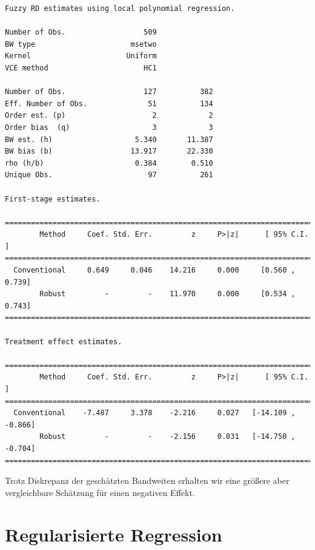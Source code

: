 \documentclass[
  a4paper,
  DIV=11,
  oneside]{scrreprt}
\begin{document}
\begin{verbatim}
Fuzzy RD estimates using local polynomial regression.

Number of Obs.                  509
BW type                      msetwo
Kernel                      Uniform
VCE method                      HC1

Number of Obs.                  127          382
Eff. Number of Obs.              51          134
Order est. (p)                    2            2
Order bias  (q)                   3            3
BW est. (h)                   5.340       11.387
BW bias (b)                  13.917       22.330
rho (h/b)                     0.384        0.510
Unique Obs.                      97          261

First-stage estimates.

=============================================================================
        Method     Coef. Std. Err.         z     P>|z|      [ 95% C.I. ]       
=============================================================================
  Conventional     0.649     0.046    14.216     0.000     [0.560 , 0.739]     
        Robust         -         -    11.970     0.000     [0.534 , 0.743]     
=============================================================================

Treatment effect estimates.

=============================================================================
        Method     Coef. Std. Err.         z     P>|z|      [ 95% C.I. ]       
=============================================================================
  Conventional    -7.487     3.378    -2.216     0.027   [-14.109 , -0.866]    
        Robust         -         -    -2.156     0.031   [-14.750 , -0.704]    
=============================================================================
\end{verbatim}

Trotz Diskrepanz der geschätzten Bandweiten erhalten wir eine größere
aber vergleichbare Schätzung für einen negativen Effekt.


\chapter{Regularisierte Regression}\label{regularisierte-regression}
\end{document}
